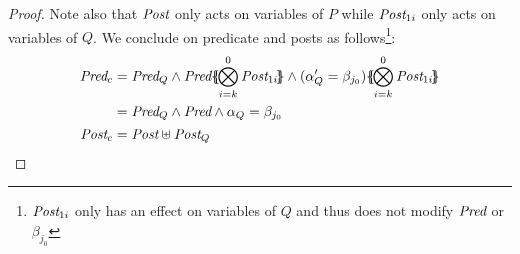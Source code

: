 \documentclass{lmcs}
\begin{document}
\begin{proof}
Note also that $\Post$ only acts on variables of $P$ while $\Post_{1i}$ only acts on  variables of $Q$. We conclude on predicate and posts as follows\footnote{$\Post_{1i}$ only has an effect on variables of $Q$ and thus does not modify $\Pred$ or $\beta_{j_0}$}:
\begin{equation*}
\begin{split}
\Pred_c&=\Pred_Q\land\Pred\subst{\bigotimes_{i=k}^{0}{\Post_{1i}}}\land
(\alpha'_Q=\beta_{j_0})\subst{\bigotimes_{i=k}^{0}{\Post_{1i}}}\\
&=\Pred_Q\land\Pred\land \alpha_Q=\beta_{j_0}\\[.3ex]
\Post_c&=\Post\uplus\Post_Q \qedhere
\end{split}
\end{equation*}
\end{proof}
\end{document}
